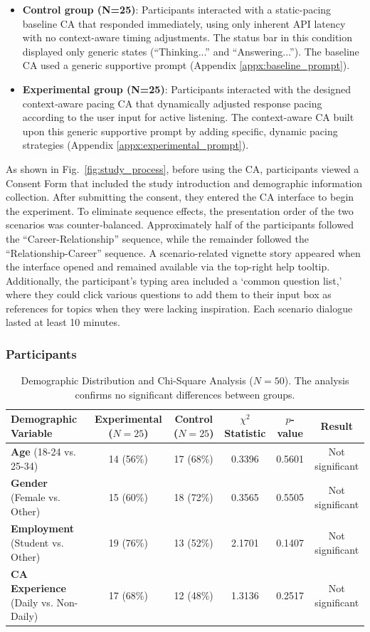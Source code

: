 \begin{itemize}
\item \textbf{Control group (N=25)}: Participants interacted with a static-pacing baseline CA that responded immediately, using only inherent API latency with no context-aware timing adjustments. The status bar in this condition displayed only generic states (``Thinking...'' and ``Answering...''). The baseline CA used a generic supportive prompt (Appendix \ref{appx:baseline_prompt}).
\item \textbf{Experimental group (N=25)}: Participants interacted with the designed context‑aware pacing CA that dynamically adjusted response pacing according to the user input for active listening. The context-aware CA built upon this generic supportive prompt by adding specific, dynamic pacing strategies (Appendix \ref{appx:experimental_prompt}).
\end{itemize}


As shown in Fig.~\ref{fig:study_process}, before using the CA, participants viewed a Consent Form that included the study introduction and demographic information collection. After submitting the consent, they entered the CA interface to begin the experiment.
To eliminate sequence effects, the presentation order of the two scenarios was counter‑balanced. Approximately half of the participants followed the ``Career-Relationship'' sequence, while the remainder followed the ``Relationship-Career'' sequence.
A scenario-related vignette story appeared when the interface opened and remained available via the top-right help tooltip. Additionally, the participant's typing area included a `common question list,' where they could click various questions to add them to their input box as references for topics when they were lacking inspiration. Each scenario dialogue lasted at least 10 minutes. 

\subsubsection{Participants}


\begin{table}[t]
\centering
\small
\caption{Demographic Distribution and Chi-Square Analysis ($N=50$). The analysis confirms no significant differences between groups.}
\label{tab:demographics_chi_square}
\begin{tabular}{lccccc}
\toprule
\textbf{Demographic Variable} & \textbf{Experimental ($N=25$)} & \textbf{Control ($N=25$)} & \textbf{$\chi^2$ Statistic} & \textbf{$p$-value} & \textbf{Result} \\
\midrule
\textbf{Age} (18-24 vs. 25-34) & 14 (56\%) & 17 (68\%) & 0.3396 & 0.5601 & Not significant \\
\textbf{Gender} (Female vs. Other) & 15 (60\%) & 18 (72\%) & 0.3565 & 0.5505 & Not significant \\
\textbf{Employment} (Student vs. Other) & 19 (76\%) & 13 (52\%) & 2.1701 & 0.1407 & Not significant \\
\textbf{CA Experience} (Daily vs. Non-Daily) & 17 (68\%) & 12 (48\%) & 1.3136 & 0.2517 & Not significant \\
\bottomrule
\end{tabular}
\end{table}


